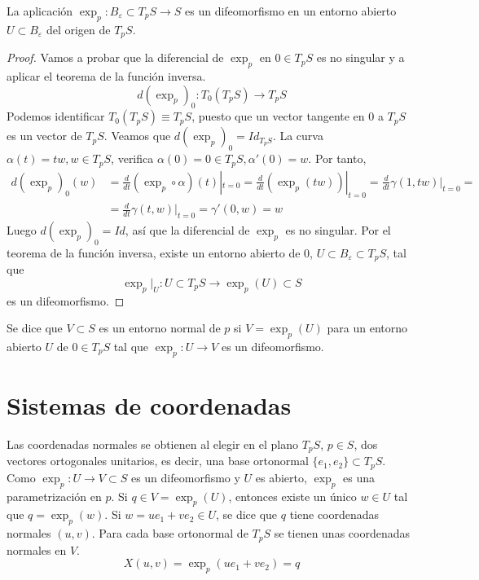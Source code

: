 \begin{proposition}
    La aplicación $\exp_p : B_\varepsilon \subset T_pS \to S$ es un difeomorfismo en un entorno abierto $U \subset B_\varepsilon$ del origen de $T_pS$.

    \begin{proof}
        Vamos a probar que la diferencial de $\exp_p$ en $0 \in T_pS$ es no singular y a aplicar el teorema de la función inversa.
        $$d(\exp_p)_0: T_0(T_pS) \to T_pS$$
        Podemos identificar $T_0(T_pS) \equiv T_pS$, puesto que un vector tangente en 0 a $T_pS$ es un vector de $T_pS$.
        Veamos que $d(\exp_p)_0 = Id_{T_pS}$.
        La curva $\alpha(t) = tw, w \in T_pS$, verifica $\alpha(0) = 0 \in T_pS, \alpha'(0) = w$.
        Por tanto,
        \begin{align*}
            d(\exp_p)_0(w) & = \frac{d}{dt} (\exp_p \circ \alpha)(t)|_{t=0} = \frac{d}{dt} (\exp_p(tw))|_{t=0} = \frac{d}{dt} \gamma(1, tw)|_{t=0} = \\
                           & = \frac{d}{dt} \gamma(t, w)|_{t=0} = \gamma'(0, w) = w
        \end{align*}
        Luego $d(\exp_p)_0 = Id$, así que la diferencial de $\exp_p$ es no singular.
        Por el teorema de la función inversa, existe un entorno abierto de 0, $U \subset B_\varepsilon \subset T_pS$, tal que
        $$\exp_p|_U: U \subset T_pS \to \exp_p(U) \subset S$$
        es un difeomorfismo.
    \end{proof}
\end{proposition}



\begin{definition}
    Se dice que $V \subset S$ es un entorno normal de $p$ si $V = \exp_p(U)$ para un entorno abierto $U$ de $0 \in T_pS$ tal que $\exp_p : U \to V$ es un difeomorfismo.
\end{definition}

\section{Sistemas de coordenadas}

\begin{definition}
    Las coordenadas normales se obtienen al elegir en el plano $T_pS$, $p \in S$, dos vectores ortogonales unitarios, es decir, una base ortonormal $\{e_1, e_2\} \subset T_pS$.\\
    Como $\exp_p : U \to V \subset S$ es un difeomorfismo y $U$ es abierto, $\exp_p$ es una parametrización en $p$.
    Si $q \in V = \exp_p(U)$, entonces existe un único $w \in U$ tal que $q = \exp_p(w)$.
    Si $w = ue_1 + ve_2 \in U$, se dice que $q$ tiene coordenadas normales $(u, v)$.
    Para cada base ortonormal de $T_pS$ se tienen unas coordenadas normales en $V$.
    $$X(u, v) = \exp_p(ue_1 + ve_2) = q$$
\end{definition}

